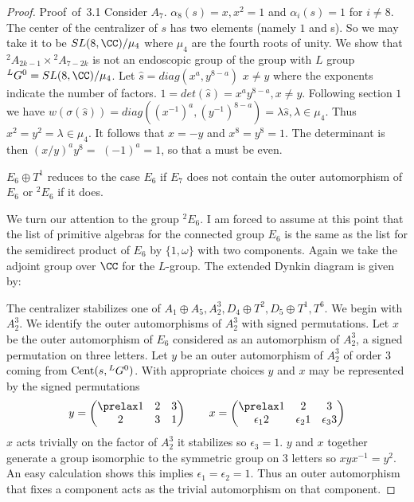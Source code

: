 \documentclass{memo-l}
\theoremstyle{definition}
\theoremstyle{remark}
\numberwithin{section}{chapter}
\numberwithin{equation}{chapter}
\begin{document}
\begin{proof} {Proof\ of\ 3.1}
   Consider $A_{7}$.  ${\alpha}_{8}(s) = x, x^{2} = 1$ and ${\alpha}_{i}(s) = 1$
for $i \ne 8$.  The center of the centralizer of $s$ has two elements
(namely $1$ and s).  So we may take it to be $SL(8,{\CC})/{\mu}_{4}$
where ${\mu}_{4}$ are the fourth roots of unity.  We show that
${}^{2}A_{2k-1}\times {}^{2}A_{7-2k}$ is not an endoscopic group of the group with
$L$ group ${}^{L}G^{0}  =  SL(8,{\CC})/{\mu}_{4}$.  Let $\hat s  = 
diag(x^{a},y^{8-a})$ $x \ne y$ where the exponents indicate the number of
factors.  $1  =  det(\hat s )  =  x^{a}y^{8-a}, x \ne y$.  Following section $1$
we have $w({\sigma}(\hat s ))  =  diag((x^{-1})^{a},(y^{-1})^{8-a})  = 
{\lambda}\hat s , {\lambda}  \in  {\mu}_{4}$.  Thus $x^{2} = y^{2} = {\lambda}
 \in  {\mu}_{4}$.  It follows that $x = -y$ and $x^{8} = y^{8} = 1$.  The
determinant is then $(x/y)^{a}y^{8}  = $ $(-1)^{a}  =  1$, so that a must be
even.

   $E_{6}\oplus T^{1}$ reduces to the case $E_{6}$ if $E_{7}$ does not contain
the outer automorphism of $E_{6}$ or ${}^{2}E_{6}$ if it does.

  We turn our attention to the group ${}^{2}E_{6}$.  I am
forced to assume at this point that the list of primitive algebras for the
connected group $E_{6}$ is the same as the list for the semidirect
product of
$E_{6}$ by $\{1,{\omega}\}$ 
with two components.  Again we take the adjoint group over ${\CC}$ for the $L$-group.
The extended Dynkin diagram is given by:
\enddefinition

\medskip

   The centralizer stabilizes one of $A_{1}\oplus A_{5}, A_{2}^{3},
D_{4}\oplus T^{2}, D_{5}\oplus T^{1}, T^{6}$.  We begin with $A_{2}^{3}$.  We
identify the outer automorphisms of $A_{2}^{3}$ with signed permutations.
Let $x$ be the outer automorphism of $E_6$ considered as an automorphism of
$A_2^3$, a signed permutation on three letters.  Let $y$ be an outer automorphism
of $A_2^3$ of order 3 coming from $\hbox{Cent}(s,{}^LG^0)$.  With appropriate
choices $y$ and $x$ may be represented by the signed permutations
$$
y = \begin{pmatrix} \prelax  1&2&3\\ 2&3&1\end{pmatrix} \qquad x = \begin{pmatrix} \prelax  1&2&3\\
 \epsilon_1 2&\epsilon_2 1&\epsilon_3 3\end{pmatrix}
$$
$x$ acts trivially on the factor of $A_2^3$ it stabilizes so $\epsilon_3=1$.
$y$ and $x$ together generate a group isomorphic to the symmetric group on 3 letters
so $xyx^{-1} = y^2$.  An easy calculation shows this implies $\epsilon_1=\epsilon_2=1$.
Thus an outer automorphism that fixes a component acts as the trivial
automorphism on that component.




\end{proof}
\end{document}

